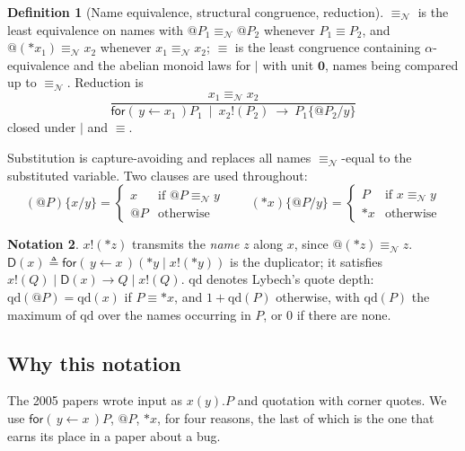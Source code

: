 \documentclass[11pt]{article}
\makeatletter
\theoremstyle{definition}
\newtheorem{definition}{Definition}[section]
\newtheorem{notation}[definition]{Notation}
\theoremstyle{plain}
\theoremstyle{remark}
\newcommand{\quo}[1]{@#1}
\newcommand{\drp}[1]{{*}#1}
\newcommand{\inp}[3]{\mathsf{for}(\,#1 \leftarrow #2\,)#3}
\newcommand{\out}[2]{#1!(#2)}
\newcommand{\nequiv}{\equiv_{\mathcal{N}}}
\newcommand{\nil}{\mathbf{0}}
\newcommand{\Dup}{\mathsf{D}}
\newcommand{\QD}{\mathrm{qd}}
\makeatother
\begin{document}
\begin{definition}[Name equivalence, structural congruence, reduction]
$\nequiv$ is the least equivalence on names with
$\quo{P_1} \nequiv \quo{P_2}$ whenever $P_1 \equiv P_2$, and
$\quo{(\drp{x_1})} \nequiv x_2$ whenever $x_1 \nequiv x_2$;
$\equiv$ is the least congruence containing $\alpha$-equivalence and the
abelian monoid laws for $\mid$ with unit $\nil$, names being compared up
to $\nequiv$. Reduction is
\[
\frac{x_1 \nequiv x_2}
     {\inp{y}{x_1}{P_1} \ \mid\ \out{x_2}{P_2} \ \to\ P_1\{\quo{P_2}/y\}}
\]
closed under $\mid$ and $\equiv$.
\end{definition}

Substitution is capture-avoiding and replaces all names $\nequiv$-equal to
the substituted variable. Two clauses are used throughout:
\[
(\quo{P})\{x/y\} =
  \begin{cases} x & \text{if } \quo{P} \nequiv y\\ \quo{P} & \text{otherwise}\end{cases}
\qquad
(\drp{x})\{\quo{P}/y\} =
  \begin{cases} P & \text{if } x \nequiv y \\ \drp{x} & \text{otherwise}\end{cases}
\]

\begin{notation}
$\out{x}{\drp{z}}$ transmits the \emph{name} $z$ along $x$, since
$\quo{(\drp{z})} \nequiv z$. $\Dup(x) \triangleq
\inp{y}{x}{(\drp{y} \mid \out{x}{\drp{y}})}$ is the duplicator; it
satisfies $\out{x}{Q} \mid \Dup(x) \to Q \mid \out{x}{Q}$.
$\QD$ denotes Lybech's quote depth: $\QD(\quo{P}) = \QD(x)$ if
$P \equiv \drp{x}$, and $1 + \QD(P)$ otherwise, with $\QD(P)$ the maximum
of $\QD$ over the names occurring in $P$, or $0$ if there are none.
\end{notation}

\subsection{Why this notation}\label{sec:notation}

The 2005 papers wrote input as $x(y).P$ and quotation with corner quotes.
We use $\inp{y}{x}{P}$, $\quo{P}$, $\drp{x}$, for four reasons, the last
of which is the one that earns its place in a paper about a bug.
\end{document}
